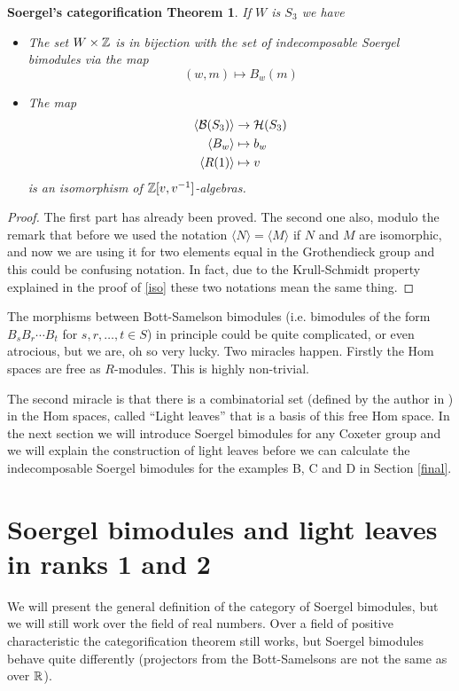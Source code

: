 \documentclass[12pt]{wart}
\newtheorem{sca}[thm]{Soergel's categorification Theorem}
\theoremstyle{remark}
\begin{document}
\begin{sca} If  $W$ is $S_3$ we have
\begin{itemize}
\item  The set $W\times \mathbb Z$ is in bijection with the set of indecomposable Soergel bimodules via the map $$(w,m)\mapsto B_w(m)$$
\item The map \begin{align*}\langle \mathcal B(S_3)\rangle& \rightarrow \mathcal H(S_3)\\ \langle B_w\rangle &\mapsto b_w\\ \langle R(1)\rangle&\mapsto v \end{align*} is an isomorphism of $\mathbb Z[v,v^{-1}]$-algebras. 
\end{itemize}
\end{sca}

\begin{proof}
The first part has already been proved. The second one also, modulo the remark that before we used the notation $\langle N\rangle =\langle M\rangle$ if $N$ and $M$ are isomorphic, and now we are using it for two elements equal in the Grothendieck group and this could be confusing notation. In fact, due to the Krull-Schmidt property explained in the proof of \ref{iso} these two notations mean the same thing. 
\end{proof}


The morphisms between Bott-Samelson bimodules (i.e. bimodules of the form $B_sB_r\cdots B_t$ for $s,r, \ldots, t\in S$) in principle could be quite complicated, or even atrocious, but we are, oh so very lucky. Two miracles happen. Firstly the Hom spaces are free as $R$-modules. This  is highly non-trivial. 

The second miracle is that there is a combinatorial set (defined by the author in \cite{Li1}) in the Hom spaces, called ``Light leaves'' that is a basis of this free Hom space. In the next section we will introduce Soergel bimodules for any Coxeter group and we will explain  the construction of light leaves before we  can calculate the indecomposable Soergel bimodules for the examples B, C and D in Section \ref{final}.


\section{Soergel bimodules and light leaves in ranks 1 and 2}\label{mor}

We will present the general definition of the category of Soergel bimodules, but we will still work over the field of real numbers. Over a field of positive characteristic  the categorification theorem still works, but Soergel bimodules behave quite differently (projectors from the Bott-Samelsons are not the same as over $\mathbb R$). 
\end{document}
